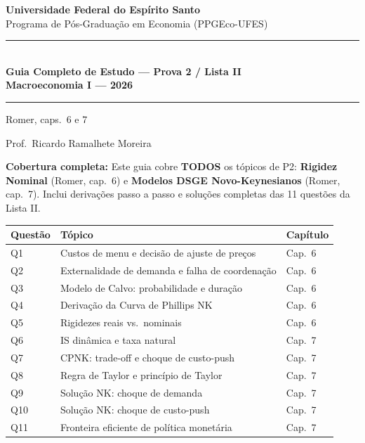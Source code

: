 \documentclass[12pt, a4paper]{article}
\begin{document}

\begin{titlepage}
\begin{center}
\vspace*{1.5cm}
{\Large\bfseries Universidade Federal do Espírito Santo}\\[0.5em]
{\large Programa de Pós-Graduação em Economia (PPGEco-UFES)}\\[2em]

\rule{\linewidth}{1.2pt}\\[0.8em]
{\LARGE\bfseries\color{cyanrbc} Guia Completo de Estudo --- Prova 2 / Lista II\\[0.4em]
\large Macroeconomia I --- 2026}\\[0.8em]
\rule{\linewidth}{1.2pt}

\vspace{0.8em}
{\large Romer, caps.\ 6 e 7}

\vspace{0.8em}
{\large Prof.\ Ricardo Ramalhete Moreira}

\vspace{1.5em}
\begin{tcolorbox}[standard, colback=provabg, colframe=provaborder, width=0.88\textwidth,
  arc=4pt, boxrule=1.2pt, left=8pt, right=8pt, top=6pt, bottom=6pt]
\centering
\textbf{\textcolor{provaborder}{Cobertura completa:}} Este guia cobre \textbf{TODOS} os
tópicos de P2: \textbf{Rigidez Nominal} (Romer, cap.\ 6) e
\textbf{Modelos DSGE Novo-Keynesianos} (Romer, cap.\ 7). Inclui derivações
passo a passo e soluções completas das 11 questões da Lista II.
\end{tcolorbox}

\vspace{1.5em}
\begin{tabular}{lll}
\toprule
\textbf{Questão} & \textbf{Tópico} & \textbf{Capítulo} \\
\midrule
Q1 & Custos de menu e decisão de ajuste de preços & Cap.\ 6 \\
Q2 & Externalidade de demanda e falha de coordenação & Cap.\ 6 \\
Q3 & Modelo de Calvo: probabilidade e duração & Cap.\ 6 \\
Q4 & Derivação da Curva de Phillips NK & Cap.\ 6 \\
Q5 & Rigidezes reais vs.\ nominais & Cap.\ 6 \\
Q6 & IS dinâmica e taxa natural & Cap.\ 7 \\
Q7 & CPNK: trade-off e choque de custo-push & Cap.\ 7 \\
Q8 & Regra de Taylor e princípio de Taylor & Cap.\ 7 \\
Q9 & Solução NK: choque de demanda & Cap.\ 7 \\
Q10 & Solução NK: choque de custo-push & Cap.\ 7 \\
Q11 & Fronteira eficiente de política monetária & Cap.\ 7 \\
\bottomrule
\end{tabular}


\end{center}
\end{titlepage}
\end{document}

